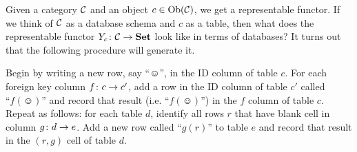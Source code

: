 \documentclass[CT4S-EN-RU]{subfiles}
\begin{document}
\begin{definitionRUS}\label{def:representable functor}
\end{definitionRUS}

\begin{exampleENG}
Given a category $\mathcal{C}$ and an object $c\in\textnormal{Ob}(\mathcal{C})$, we get a representable functor. If we think of $\mathcal{C}$ as a database schema and $c$ as a table, then what does the representable functor $Y_c\colon\mathcal{C}\rightarrow{\bf Set}$ look like in terms of databases? It turns out that the following procedure will generate it. 

Begin by writing a new row, say “$\smiley$”, in the ID column of table $c$. For each foreign key column $f\colon c\rightarrow c'$, add a row in the ID column of table $c'$ called $“f(\smiley)”$ and record that result (i.e. “$f(\smiley)$”) in the $f$ column of table $c$. Repeat as follows: for each table $d$, identify all rows $r$ that have blank cell in column $g\colon d\rightarrow e$. Add a new row called $“g(r)”$ to table $e$ and record that result in the $(r,g)$ cell of table $d$.


\end{exampleENG}
\end{document}
